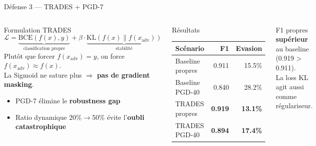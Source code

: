\documentclass[aspectratio=169,11pt]{beamer}
\begin{document}
\begin{frame}{D\'efense 3 --- TRADES + PGD-7}
\begin{columns}[T]
\begin{block}{Formulation TRADES}
\[
\mathcal{L} = \underbrace{\text{BCE}(f(x),y)}_{\text{classification propre}}
+ \beta \cdot \underbrace{\text{KL}(f(x) \| f(x_{\text{adv}}))}_{\text{stabilit\'e}}
\]
Plut\^ot que forcer $f(x_{\text{adv}}) = y$, on force $f(x_{\text{adv}}) \approx f(x)$.\\
La Sigmoid ne sature plus $\Rightarrow$ \textbf{pas de gradient masking}.

\medskip
\begin{itemize}\setlength\itemsep{2pt}
    \item PGD-7 \'elimine le \textbf{robustness gap}
    \item Ratio dynamique 20\%$\to$50\% \'evite l'\textbf{oubli catastrophique}
\end{itemize}
\end{block}

\begin{block}{R\'esultats}
\footnotesize
\begin{tabular}{lrr}
\toprule
\textbf{Sc\'enario} & \textbf{F1} & \textbf{Evasion} \\
\midrule
Baseline propres & 0.911 & 15.5\% \\
Baseline PGD-40  & 0.840 & 28.2\% \\
\midrule
\rowcolor{inptblue!15}
TRADES propres   & \textbf{0.919} & \textbf{13.1\%} \\
\rowcolor{inptblue!25}
TRADES PGD-40    & \textbf{0.894} & \textbf{17.4\%} \\
\bottomrule
\end{tabular}
\end{block}

\vspace{0.4em}
\footnotesize
\textcolor{inptblue}{F1 propres \textbf{sup\'erieur} au baseline (0.919 > 0.911).\\
La loss KL agit aussi comme r\'egulariseur.}
\end{columns}
\end{frame}
\end{document}
